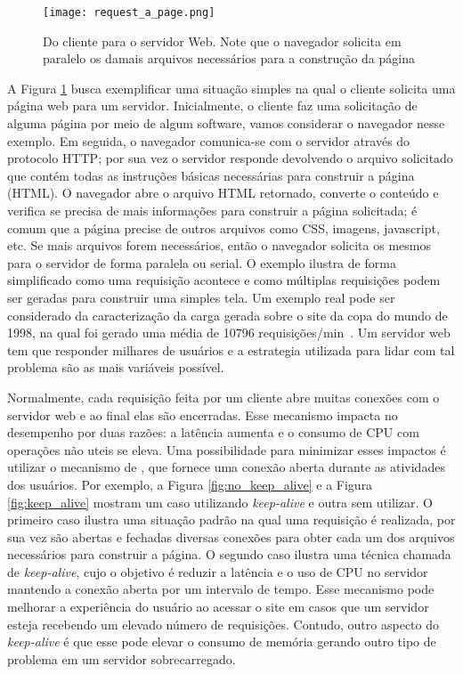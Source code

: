 \begin{figure}[!h]
  \centering
  \texttt{[image: request\_a\_page.png]}
  \caption{Do cliente para o servidor Web. Note que o navegador solicita em paralelo os damais arquivos necessários para a construção da página}
  \label{fig:client_to_web_server}
\end{figure}

A Figura \ref{fig:client_to_web_server} busca exemplificar uma situação simples
na qual o cliente solicita uma página web para um servidor. Inicialmente, o
cliente faz uma solicitação de alguma página por meio de algum software, vamos
considerar o navegador nesse exemplo. Em seguida, o navegador comunica-se com o
servidor através do protocolo HTTP; por sua vez o servidor responde devolvendo
o arquivo solicitado que contém todas as instruções básicas necessárias para
construir a página (HTML). O navegador abre o arquivo HTML retornado, converte
o conteúdo e verifica se precisa de mais informações para construir a página
solicitada; é comum que a página precise de outros arquivos como CSS, imagens,
javascript, etc. Se mais arquivos forem necessários, então o navegador solicita
os mesmos para o servidor de forma paralela ou serial. O exemplo ilustra de
forma simplificado como uma requisição acontece e como múltiplas requisições
podem ser geradas para construir uma simples tela. Um exemplo real pode ser
considerado da caracterização da carga gerada sobre o site da copa do mundo de
1998, na qual foi gerado uma média de 10796 requisições/min~\citep{worldcup}.
Um servidor web tem que responder milhares de usuários e a estrategia utilizada
para lidar com tal problema são as mais variáveis possível.

Normalmente, cada requisição feita por um cliente abre muitas conexões com o
servidor web e ao final elas são encerradas. Esse mecanismo impacta no
desempenho por duas razões: a latência aumenta e o consumo de CPU com operações
não uteis se eleva. Uma possibilidade para minimizar esses impactos é utilizar
o mecanismo de , que fornece uma conexão
aberta durante as atividades dos usuários. Por exemplo, a Figura
\ref{fig:no_keep_alive} e a Figura \ref{fig:keep_alive} mostram um caso
utilizando \textit{keep-alive} e outra sem utilizar. O primeiro caso ilustra
uma situação padrão na qual uma requisição é realizada, por sua vez são abertas
e fechadas diversas conexões para obter cada um dos arquivos necessários para
construir a página. O segundo caso ilustra uma técnica chamada de
\textit{keep-alive}, cujo o objetivo é reduzir a latência e o uso de CPU no
servidor mantendo a conexão aberta por um intervalo de tempo.  Esse mecanismo
pode melhorar a experiência do usuário ao acessar o site em casos que um
servidor esteja recebendo um elevado número de requisições. Contudo, outro
aspecto do \textit{keep-alive} é que esse pode elevar o consumo de memória
gerando outro tipo de problema em um servidor sobrecarregado.

